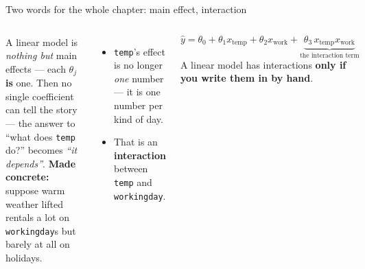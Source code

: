 \documentclass[aspectratio=169]{beamer}
\begin{document}
\begin{frame}{Two words for the whole chapter: main effect, interaction}
  \begin{columns}[T]
    \vskip 4pt
    A linear model is \emph{nothing but} main effects --- each $\theta_j$ \textbf{is} one.
    \vskip 8pt
    \vskip 4pt
    Then no single coefficient can tell the story --- the answer to ``what does \texttt{temp} do?''
    becomes \emph{``it depends''}.
    \textbf{Made concrete:} suppose warm weather lifted rentals a lot on \texttt{workingday}s but
    barely at all on holidays.
    \begin{itemize}\small
      \item \texttt{temp}'s effect is no longer \emph{one} number --- it is one number per kind of
        day.
      \item That is an \textbf{interaction} between \texttt{temp} and \texttt{workingday}.
    \end{itemize}
    \vskip 4pt
    \[ \hat y = \theta_0 + \theta_1 x_{\text{temp}} + \theta_2 x_{\text{work}}
       + \underbrace{\theta_3\, x_{\text{temp}} x_{\text{work}}}_{\text{the interaction term}} \]
    \vskip 2pt
    \footnotesize A linear model has interactions \textbf{only if you write them in by hand}.
  \end{columns}
  \vskip 4pt
\end{frame}
\end{document}

